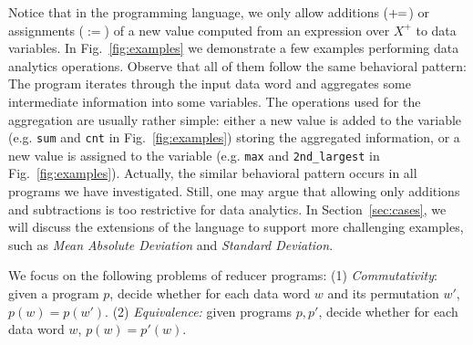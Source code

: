 

Notice that in the programming language, we only allow additions ($+\!\!=$) or assignments ($:=$) of a new value computed from an expression over $X^+$ to data variables. 
In Fig.~\ref{fig:examples} we demonstrate a few examples performing data analytics operations. Observe that all of them follow the same behavioral pattern: The program iterates through the input data word and aggregates some intermediate information into some variables. The operations used for the aggregation are usually rather simple: either a new value is added to the variable (e.g. \texttt{sum} and \texttt{cnt} in Fig.~\ref{fig:examples}) storing the aggregated information, or a new value is assigned to the variable (e.g. \texttt{max} and \texttt{2nd\_largest} in Fig.~\ref{fig:examples}). Actually, the similar behavioral pattern occurs in all programs we have investigated.
Still, one may argue that allowing only additions and subtractions is too restrictive for data analytics. 
In Section~\ref{sec:cases}, we will discuss the extensions of the language to support more challenging examples, such as \emph{Mean Absolute Deviation} and \emph{Standard Deviation}.


 

We focus on the following problems of reducer programs: (1) \emph{Commutativity}: given a program $p$, decide whether for each data word $w$ and its permutation $w'$, $p(w) = p(w')$. (2) \emph{Equivalence:} given programs $p,p'$, decide whether for each data word $w$, $p(w)=p'(w)$.





